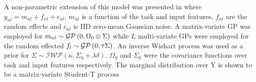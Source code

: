A non-parametric extension of this model was presented in\cite{Yu2009} where $y_{nl} = m_{nl} + f_{nl} + \epsilon_{nl}$, $m_{nl}$ is a function of the task and input features, $f_{nl}$ are the random effects and $\epsilon_{nl}$ is IID zero-mean Gaussian noise. A matrix-variate GP was employed for $m_{nl} \sim \mathcal{GP} \left( {0}, \Omega_0 \otimes \Sigma \right)$ while $L$ multi-variate GPs were employed for the random effected $f_{l} \sim \mathcal{GP} \left( {0}, \tau \Sigma \right)$. An inverse Wishart process\cite{Dawid1981} was used as a prior for $\Sigma \sim \mathcal{IWP} \left(\kappa, \Sigma_0 + \lambda\delta\right)$. $\Omega_0$ and $\Sigma_0$ were the covariance functions over task and input features respectively. The marginal distribution over Y is shown to be a matrix-variate Student-T process



